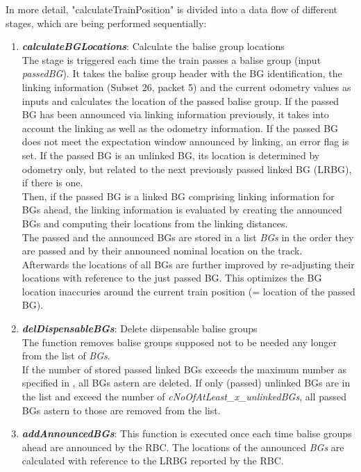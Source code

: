 In more detail, "calculateTrainPosition" is divided into a data flow of different stages, which are being performed sequentially: 
\begin{enumerate}
\item \textbf{\textit{calculateBGLocations}}: Calculate the balise group locations\\
The  stage is triggered each time the train passes a balise group (input \textit{passedBG}). It takes the balise group header with the BG identification, the linking information (Subset 26, packet 5) and the current odometry values as inputs and calculates the location of the passed balise group. If the passed BG has been announced via linking information previously, it takes into account the linking as well as the odometry information. If the passed BG does not meet the expectation window announced by linking, an error flag is set. If the passed BG is an unlinked BG, its location is determined by odometry only, but related to the next previously passed linked BG (LRBG), if there is one.\\
Then, if the passed BG is a linked BG comprising linking information for BGs ahead, the linking information is evaluated by creating the announced BGs and computing their locations from the linking distances.\\
The passed and the announced BGs are stored in a list \textit{BGs} in the order they are passed and by their announced nominal location on the track.\\
Afterwards the locations of all BGs are further improved by re-adjusting their locations with reference to the just passed BG. This optimizes the BG location inaccuries around the current train position (= location of the passed BG). 

\item \textbf{\textit{delDispensableBGs}}: Delete dispensable balise groups\\
The function removes balise groups supposed not to be needed any longer from the list of \textit{BGs}.\\
If the number of stored passed linked BGs exceeds the maximum number as specified in \cite[Chapter~3.6.2.2.2 c]{subset-026}, all BGs astern are deleted.
If only (passed) unlinked BGs are in the list and exceed the number of \textit{cNoOfAtLeast\_x\_unlinkedBGs}, all passed BGs astern to those are removed from the list. 

\item \textbf{\textit{addAnnouncedBGs}}: This function is executed once each time balise groups ahead are announced by the RBC. The locations of the announced \textit{BGs} are calculated with reference to the LRBG reported by the RBC. 


\end{enumerate}
